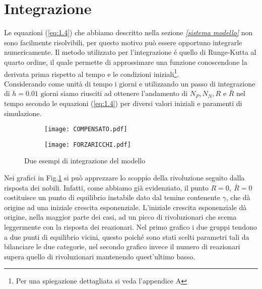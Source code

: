 \section{Integrazione}
Le equazioni (\ref{eq:1.4}) che abbiamo descritto nella sezione \emph{\ref{sistema modello}} non sono facilmente risolvibili, per questo motivo può essere opportuno integrarle numericamente. Il metodo utilizzato per l'integrazione é quello di Runge-Kutta al quarto ordine, il quale permette di approssimare una funzione conoscendone la derivata prima rispetto al tempo e le condizioni iniziali\footnote{Per una spiegazione dettagliata si veda l'appendice A}. \\
Considerando come unità di tempo i giorni e utilizzando un passo di integrazione di $ h=0.01 \text{ giorni}$ siamo riusciti ad ottenere l'andamento di $ N_{P}, N_{N}, R$ e $\bar{R} $ nel tempo secondo le equazioni (\ref{eq:1.4}) per diversi valori iniziali e paramenti di simulazione.
\begin{figure}[H]
	\centering
	\begin{subfigure}[H]{0.49\textwidth}
		\centering
		\texttt{[image: COMPENSATO.pdf]}
	\end{subfigure}
	\hfill
	\begin{subfigure}[H]{0.49\textwidth}
		\centering
		\texttt{[image: FORZARICCHI.pdf]}
	\end{subfigure}
\caption{Due esempi di integrazione del modello}
\label{grafici integrazione}
\end{figure}
Nei grafici in Fig.\ref{grafici integrazione} si può apprezzare lo scoppio della rivoluzione seguito dalla risposta dei nobili. Infatti, come abbiamo già evidenziato, il punto $R=0,\ \bar{R}=0$ costituisce un punto di equilibrio instabile dato dal temine contenente $\gamma$, che dà origine ad una iniziale crescita esponenziale. L'iniziale crescita esponenziale dà origine, nella maggior parte dei casi, ad un picco di rivoluzionari che scema leggermente con la risposta dei reazionari. Nel primo grafico i due gruppi tendono a due punti di equilibrio vicini, questo poiché sono stati scelti parametri tali da bilanciare le due categorie, nel secondo grafico invece il numero di reazionari supera quello di rivoluzionari mantenendo quest'ultimo basso.
